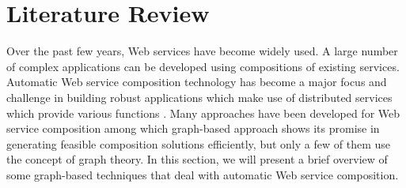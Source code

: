 \section{Literature Review}
Over the past few years, Web services have become widely used. A large number of complex applications can be developed using compositions of existing services. Automatic Web service composition technology has become a major focus and challenge in building robust applications which make use of distributed services which provide various functions \cite{29}. Many approaches have been developed for Web service composition among which graph-based approach shows its promise in generating feasible composition solutions efficiently, but only a few of them use the concept of graph theory. In this section, we will present a brief overview of some graph-based techniques that deal with automatic Web service composition.
\par

